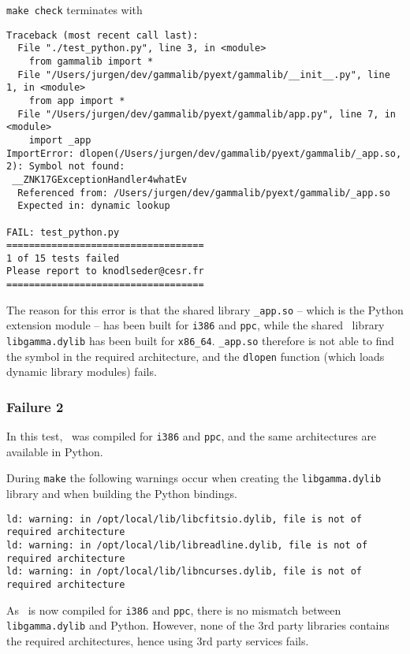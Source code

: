 \documentclass{article}[12pt,a4]
\begin{document}
{\tt make check} terminates with
\begin{verbatim}
Traceback (most recent call last):
  File "./test_python.py", line 3, in <module>
    from gammalib import *
  File "/Users/jurgen/dev/gammalib/pyext/gammalib/__init__.py", line 1, in <module>
    from app import *
  File "/Users/jurgen/dev/gammalib/pyext/gammalib/app.py", line 7, in <module>
    import _app
ImportError: dlopen(/Users/jurgen/dev/gammalib/pyext/gammalib/_app.so, 2): Symbol not found:
 __ZNK17GExceptionHandler4whatEv
  Referenced from: /Users/jurgen/dev/gammalib/pyext/gammalib/_app.so
  Expected in: dynamic lookup

FAIL: test_python.py
===================================
1 of 15 tests failed
Please report to knodlseder@cesr.fr
===================================
\end{verbatim}
The reason for this error is that the shared library {\tt \_app.so} -- which is the Python extension
module -- has been built for {\tt i386} and {\tt ppc}, while the shared \this\ library {\tt libgamma.dylib}
has been built for {\tt x86\_64}. 
{\tt \_app.so} therefore is not able to find the symbol in the required architecture, and the
{\tt dlopen} function (which loads dynamic library modules) fails.


\subsubsection{Failure 2}

In this test, \this\ was compiled for {\tt i386} and {\tt ppc}, and the same architectures are
available in Python.

During {\tt make} the following warnings occur when creating the {\tt libgamma.dylib}
library and when building the Python bindings.
\begin{verbatim}
ld: warning: in /opt/local/lib/libcfitsio.dylib, file is not of required architecture
ld: warning: in /opt/local/lib/libreadline.dylib, file is not of required architecture
ld: warning: in /opt/local/lib/libncurses.dylib, file is not of required architecture
\end{verbatim}
As \this\ is now compiled for {\tt i386} and {\tt ppc}, there is no mismatch between
{\tt libgamma.dylib} and Python.
However, none of the 3rd party libraries contains the required architectures, hence using
3rd party services fails.
\end{document}
